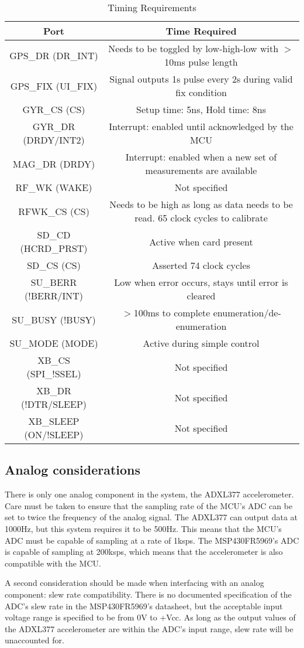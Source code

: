 \begin{table}[H]
  \centering
  \caption{Timing Requirements}
    \begin{tabular}{|c|c|}
    \hline
    Port  & Time Required \\
    \hline \hline
    GPS\_DR (DR\_INT) & Needs to be toggled by low-high-low with $>$10ms pulse length \\ \hline
    GPS\_FIX (UI\_FIX) & Signal outputs 1s pulse every 2s during valid fix condition \\ \hline
    GYR\_CS (CS) & Setup time: 5ns, Hold time: 8ns \\ \hline
    GYR\_DR (DRDY/INT2) & Interrupt: enabled until acknowledged by the MCU \\ \hline
    MAG\_DR (DRDY) & Interrupt: enabled when a new set of measurements are available \\ \hline
    RF\_WK (WAKE) & Not specified \\ \hline
    RFWK\_CS (CS) & Needs to be high as long as data needs to be read. 65 clock cycles to calibrate \\ \hline
    SD\_CD (HCRD\_PRST) & Active when card present \\ \hline
    SD\_CS (CS) & Asserted 74 clock cycles \\ \hline
    SU\_BERR (!BERR/INT) & Low when error occurs, stays until error is cleared \\ \hline
    SU\_BUSY (!BUSY) & $>$100ms to complete enumeration/de-enumeration \\ \hline
    SU\_MODE (MODE) & Active during simple control \\ \hline
    XB\_CS (SPI\_!SSEL) & Not specified \\ \hline
    XB\_DR (!DTR/SLEEP) & Not specified \\ \hline
    XB\_SLEEP (ON/!SLEEP) & Not specified \\ \hline
    \end{tabular}%
  \label{tab:timeReqs}%
\end{table}%


\subsection{Analog considerations}
There is only one analog component in the system, the ADXL377 accelerometer. Care must be taken to ensure that the sampling rate of the MCU's ADC can be set to twice the frequency of the analog signal. The ADXL377 can output data at 1000Hz, but this system requires it to be 500Hz. This means that the MCU's ADC must be capable of sampling at a rate of 1ksps. The MSP430FR5969's ADC is capable of sampling at 200ksps, which means that the accelerometer is also compatible with the MCU.

A second consideration should be made when interfacing with an analog component: slew rate compatibility. There is no documented specification of the ADC's slew rate in the MSP430FR5969's datasheet, but the acceptable input voltage range is specified to be from 0V to +Vcc. As long as the output values of the ADXL377 accelerometer are within the ADC's input range, slew rate will be unaccounted for.


